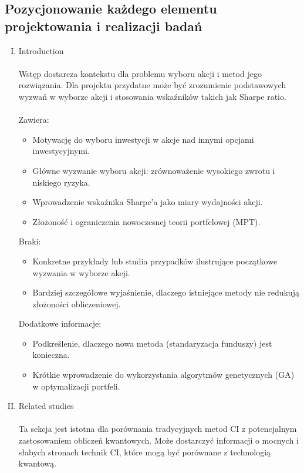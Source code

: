 \documentclass[polish,envcountsect,10pt]{article}
\begin{document}
\subsection{Pozycjonowanie każdego elementu projektowania i realizacji badań}

\begin{enumerate}[I.]
    \item  Introduction
    \\
    \\
    Wstęp dostarcza kontekstu dla problemu wyboru akcji i metod jego rozwiązania. Dla projektu przydatne może być zrozumienie podstawowych wyzwań w wyborze akcji i stosowania wskaźników takich jak Sharpe ratio.
    \\
    \\
    Zawiera:
        \begin{itemize}
          \item Motywację do wyboru inwestycji w akcje nad innymi opcjami inwestycyjnymi.
          \item Główne wyzwanie wyboru akcji: zrównoważenie wysokiego zwrotu i niskiego ryzyka.
          \item Wprowadzenie wskaźnika Sharpe’a jako miary wydajności akcji.
          \item Złożoność i ograniczenia nowoczesnej teorii portfelowej (MPT).
        \end{itemize}
    Braki:
        \begin{itemize}
          \item Konkretne przykłady lub studia przypadków ilustrujące początkowe wyzwania w wyborze akcji.
          \item Bardziej szczegółowe wyjaśnienie, dlaczego istniejące metody nie redukują złożoności obliczeniowej.
        \end{itemize}
    Dodatkowe informacje:
        \begin{itemize}
          \item Podkreślenie, dlaczego nowa metoda (standaryzacja funduszy) jest konieczna.
          \item Krótkie wprowadzenie do wykorzystania algorytmów genetycznych (GA) w optymalizacji portfeli.
        \end{itemize}
    \item  Related studies
    \\
    \\
    Ta sekcja jest istotna dla porównania tradycyjnych metod CI z potencjalnym zastosowaniem obliczeń kwantowych. Może dostarczyć informacji o mocnych i słabych stronach technik CI, które mogą być porównane z technologią kwantową.

\end{enumerate}
\end{document}
